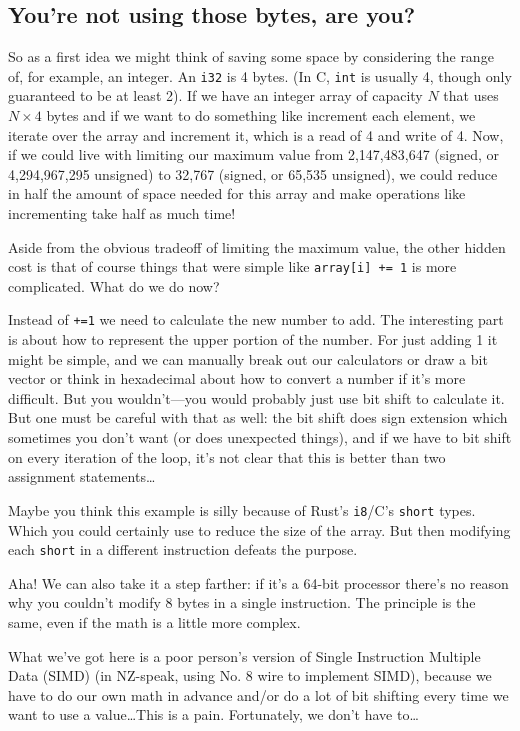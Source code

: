 \documentclass[a4paper]{report}
\begin{document}
\subsection*{You're not using those bytes, are you?}
So as a first idea we might think of saving some space by considering the range of, for example, an integer. An \texttt{i32} is 4 bytes. (In C, \texttt{int} is usually 4, though only guaranteed to be at least 2). If we have an integer array of capacity $N$ that uses $N \times 4$ bytes and if we want to do something like increment each element, we iterate over the array and increment it, which is a read of 4 and write of 4. Now, if we could live with limiting our maximum value from 2,147,483,647 (signed, or 4,294,967,295 unsigned) to 32,767  (signed, or 65,535 unsigned), we could reduce in half the amount of space needed for this array and make operations like incrementing take half as much time!

Aside from the obvious tradeoff of limiting the maximum value, the other hidden cost is that of course things that were simple like \texttt{array[i] += 1} is more complicated. What do we do now?

Instead of \texttt{+=1} we need to calculate the new number to add. The interesting part is about how to represent the upper portion of the number. For just adding 1 it might be simple, and we can manually break out our calculators or draw a bit vector or think in hexadecimal about how to convert a number if it's more difficult. But you wouldn't---you would probably just use bit shift to calculate it. But one must be careful with that as well: the bit shift does sign extension which sometimes you don't want (or does unexpected things), and if we have to bit shift on every iteration of the loop, it's not clear that this is better than two assignment statements\ldots

Maybe you think this example is silly because of Rust's \texttt{i8}/C's \texttt{short} types. Which you could certainly use to reduce the size of the array. But then modifying each \texttt{short} in a different instruction defeats the purpose.

Aha! We can also take it a step farther: if it's a 64-bit processor there's no reason why you couldn't modify 8 bytes in a single instruction. The principle is the same, even if the math is a little more complex.

What we've got here is a poor person's version of Single Instruction Multiple Data (SIMD) (in NZ-speak, using No. 8 wire to implement SIMD), because we have to do our own math in advance and/or do a lot of bit shifting every time we want to use a value\ldots This is a pain. Fortunately, we don't have to\ldots
\end{document}
